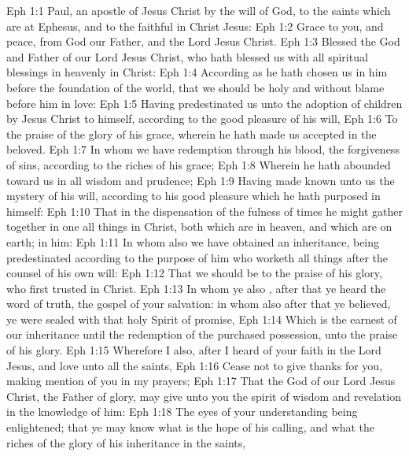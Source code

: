\vs Eph 1:1 Paul, an apostle of Jesus Christ by the will of God, to the saints which are at Ephesus, and to the faithful in Christ Jesus:
\vs Eph 1:2 Grace  to you, and peace, from God our Father, and  the Lord Jesus Christ.
\vs Eph 1:3 Blessed  the God and Father of our Lord Jesus Christ, who hath blessed us with all spiritual blessings in heavenly  in Christ:
\vs Eph 1:4 According as he hath chosen us in him before the foundation of the world, that we should be holy and without blame before him in love:
\vs Eph 1:5 Having predestinated us unto the adoption of children by Jesus Christ to himself, according to the good pleasure of his will,
\vs Eph 1:6 To the praise of the glory of his grace, wherein he hath made us accepted in the beloved.
\vs Eph 1:7 In whom we have redemption through his blood, the forgiveness of sins, according to the riches of his grace;
\vs Eph 1:8 Wherein he hath abounded toward us in all wisdom and prudence;
\vs Eph 1:9 Having made known unto us the mystery of his will, according to his good pleasure which he hath purposed in himself:
\vs Eph 1:10 That in the dispensation of the fulness of times he might gather together in one all things in Christ, both which are in heaven, and which are on earth;  in him:
\vs Eph 1:11 In whom also we have obtained an inheritance, being predestinated according to the purpose of him who worketh all things after the counsel of his own will:
\vs Eph 1:12 That we should be to the praise of his glory, who first trusted in Christ.
\vs Eph 1:13 In whom ye also , after that ye heard the word of truth, the gospel of your salvation: in whom also after that ye believed, ye were sealed with that holy Spirit of promise,
\vs Eph 1:14 Which is the earnest of our inheritance until the redemption of the purchased possession, unto the praise of his glory.
\vs Eph 1:15 Wherefore I also, after I heard of your faith in the Lord Jesus, and love unto all the saints,
\vs Eph 1:16 Cease not to give thanks for you, making mention of you in my prayers;
\vs Eph 1:17 That the God of our Lord Jesus Christ, the Father of glory, may give unto you the spirit of wisdom and revelation in the knowledge of him:
\vs Eph 1:18 The eyes of your understanding being enlightened; that ye may know what is the hope of his calling, and what the riches of the glory of his inheritance in the saints,
